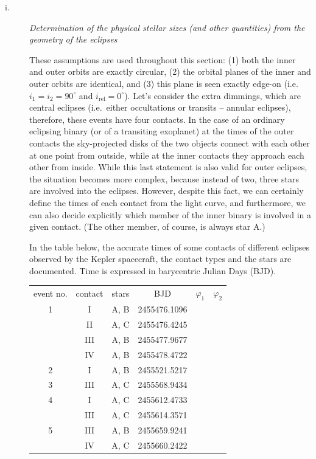 \begin{description}
\item[i.] \emph{Determination of the physical stellar sizes (and other
  quantities) from the geometry of the eclipses}

  These assumptions are used throughout this section: (1) both the inner and
  outer orbits are exactly circular, (2) the orbital planes of the inner and
  outer orbits are identical, and (3) this plane is seen exactly edge-on
  (i.e.\ $i_1 = i_2 = 90^\circ$ and $i_{\mathrm{rel}} = 0^\circ$). Let's
  consider the extra dimmings, which are central eclipses (i.e.\ either
  occultations or transits -- annular eclipses), therefore, these events
  have four contacts. In the case of an ordinary eclipsing binary (or of a
  transiting exoplanet) at the times of the outer contacts the sky-projected
  disks of the two objects connect with each other at one point from
  outside, while at the inner contacts they approach each other from inside.
  While this last statement is also valid for outer eclipses, the situation
  becomes more complex, because instead of two, three stars are involved
  into the eclipses. However, despite this fact, we can certainly define the
  times of each contact from the light curve, and furthermore, we can also
  decide explicitly which member of the inner binary is involved in a given
  contact. (The other member, of course, is always star A.)

  In the table below, the accurate times of some contacts of different
  eclipses observed by the Kepler spacecraft, the contact types and the
  stars are documented. Time is expressed in barycentric Julian Days (BJD).

  \begin{center}
  \begin{tabular}{cccccc}
  event no. & contact & stars & BJD & $\varphi_1$ & $\varphi_2$ \\
  1 & I & A, B & 2455476.1096 & & \\
    & II & A, C & 2455476.4245 & & \\
    & III & A, B & 2455477.9677 & & \\
    & IV & A, B & 2455478.4722 & & \\
  2 & I & A, B & 2455521.5217 & & \\
  3 & III & A, C & 2455568.9434 & & \\
  4 & I & A, C & 2455612.4733 & & \\
    & III & A, C & 2455614.3571 & & \\
  5 & III & A, B & 2455659.9241 & & \\
    & IV & A, C & 2455660.2422 & & \\
  \end{tabular}
  \end{center}


\end{description}
